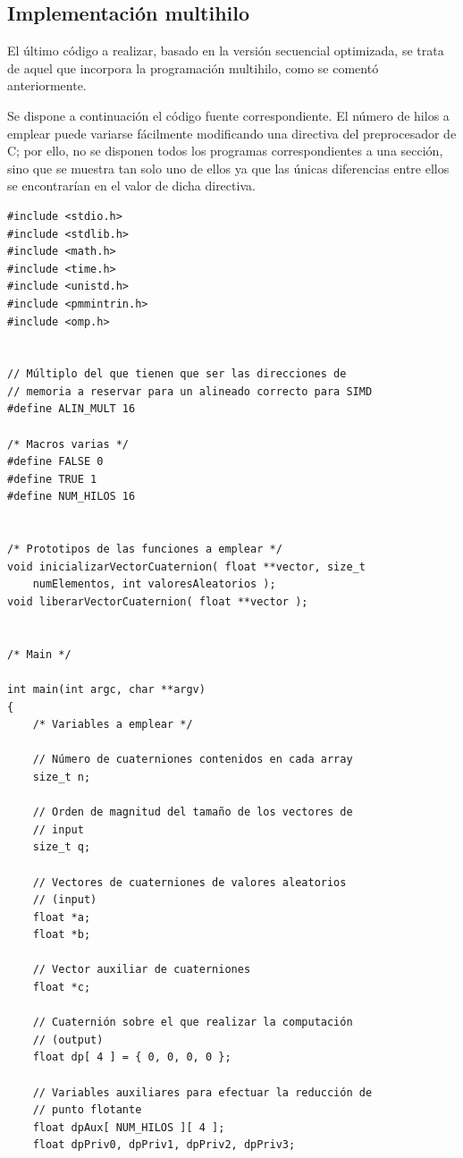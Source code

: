 \documentclass[conference]{IEEEtran}
\begin{document}
\subsection{Implementación multihilo}

El último código a realizar, basado en la versión secuencial optimizada, se trata de aquel que incorpora la programación multihilo, como se comentó anteriormente.

Se dispone a continuación el código fuente correspondiente. El número de hilos a emplear puede variarse fácilmente modificando una directiva del preprocesador de C; por ello, no se disponen todos los programas correspondientes a una sección, sino que se muestra tan solo uno de ellos ya que las únicas diferencias entre ellos se encontrarían en el valor de dicha directiva.

\begin{lstlisting}[style=CStyle, title=Código multihilo.]
#include <stdio.h>
#include <stdlib.h>
#include <math.h>
#include <time.h>
#include <unistd.h>
#include <pmmintrin.h>
#include <omp.h>


// Múltiplo del que tienen que ser las direcciones de
// memoria a reservar para un alineado correcto para SIMD
#define ALIN_MULT 16

/* Macros varias */
#define FALSE 0
#define TRUE 1
#define NUM_HILOS 16


/* Prototipos de las funciones a emplear */
void inicializarVectorCuaternion( float **vector, size_t
    numElementos, int valoresAleatorios );
void liberarVectorCuaternion( float **vector );


/* Main */

int main(int argc, char **argv)
{
    /* Variables a emplear */

    // Número de cuaterniones contenidos en cada array
    size_t n;

    // Orden de magnitud del tamaño de los vectores de
    // input
    size_t q;

    // Vectores de cuaterniones de valores aleatorios
    // (input)
    float *a;
    float *b;

    // Vector auxiliar de cuaterniones
    float *c;

    // Cuaternión sobre el que realizar la computación
    // (output)
    float dp[ 4 ] = { 0, 0, 0, 0 };

    // Variables auxiliares para efectuar la reducción de
    // punto flotante
    float dpAux[ NUM_HILOS ][ 4 ];
    float dpPriv0, dpPriv1, dpPriv2, dpPriv3;


\end{lstlisting}
\end{document}
